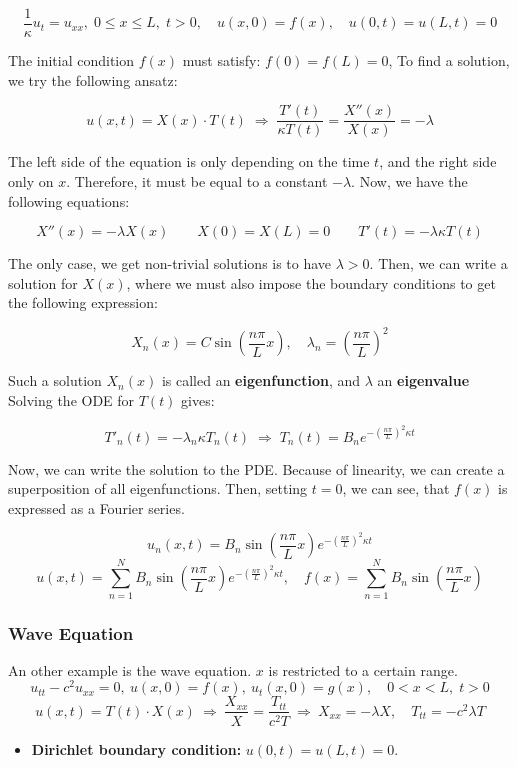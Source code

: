 \documentclass{article}
\begin{document}
\begin{twocolumn}
$$\frac1\kappa u_t = u_{xx}, \; 0 \leq x \leq L, \; t > 0, \quad u(x,0) = f(x), \quad u(0,t) = u(L,t) = 0$$

The initial condition $f(x)$ must satisfy: $f(0) = f(L) = 0$,
To find a solution, we try the following ansatz:

$$u(x,t) = X(x) \cdot T(t) \; \Rightarrow \; \frac{T'(t)}{\kappa T(t)} = \frac{X''(x)}{X(x)} = -\lambda$$

The left side of the equation is only depending on the time $t$, and the right side only on $x$. Therefore, it must be equal to a constant $-\lambda$. Now, we have the following equations:

$$X''(x) = -\lambda X(x) \qquad X(0) = X(L) = 0 \qquad T'(t) = -\lambda \kappa T(t)$$

The only case, we get non-trivial solutions is to have $\lambda > 0$. Then, we can write a solution for $X(x)$, where we must also impose the boundary conditions to get the following expression:

$$X_n(x) = C \sin\left(\frac{n \pi}{L} x\right), \quad \lambda_n = \left(\frac{n\pi}{L}\right)^2$$

Such a solution $X_n(x)$ is called an \textbf{eigenfunction}, and $\lambda$ an \textbf{eigenvalue}
Solving the ODE for $T(t)$ gives:

$$T'_n(t) = -\lambda_n \kappa T_n(t) \; \Rightarrow \; T_n(t) = B_n e^{-\left(\frac{n\pi}{L}\right)^2 \kappa t}$$

Now, we can write the solution to the PDE. 
Because of linearity, we can create a superposition of all eigenfunctions. 
Then, setting $t=0$, we can see, that $f(x)$ is expressed as a Fourier series.

$$u_n(x,t) = B_n \sin \left(\frac{n \pi}{L} x\right) e^{-\left(\frac{n\pi}{L}\right)^2 \kappa t}$$
$$u(x,t) = \sum_{n=1}^{N}B_n \sin \left(\frac{n\pi}{L} x \right) e^{-\left(\frac{n \pi}{L}\right)^2 \kappa t}, \quad f(x) = \sum_{n=1}^{N} B_n \sin \left(\frac{n\pi}{L} x \right)$$

\subsubsection{Wave Equation}

An other example is the wave equation. $x$ is restricted to a certain range. 
$$u_{tt} - c^2 u_{xx} = 0, \  u(x,0) = f(x), \ u_t(x,0) = g(x), \quad 0 < x < L, \; t > 0$$
$$u(x,t) = T(t) \cdot X(x) \ \Rightarrow \ \frac{X_{xx}}{X} = \frac{T_{tt}}{c^2T} \ \Rightarrow \ X_{xx} = -\lambda X, \quad T_{tt} = -c^2 \lambda T$$
\begin{itemize}
	\item \textbf{Dirichlet boundary condition:} $u(0,t) = u(L,t) = 0$.
	

\end{itemize}
\end{twocolumn}
\end{document}
